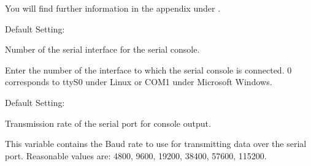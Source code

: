 \begin{description}
    You will find further information in the appendix under
    .


  
    Default Setting: 
  
  {
    Number of the serial interface for the serial console.

    Enter the number of the interface to which the serial console is connected.
    0 corresponds to ttyS0 under Linux or COM1 under Microsoft Windows.
  }

  
  Default Setting: 
  
  {Transmission rate of the serial port for console output.

    This variable contains the Baud rate to use for transmitting data over
    the serial port. Reasonable values are: 4800, 9600, 19200, 38400, 57600,
    115200.}

\end{description}
